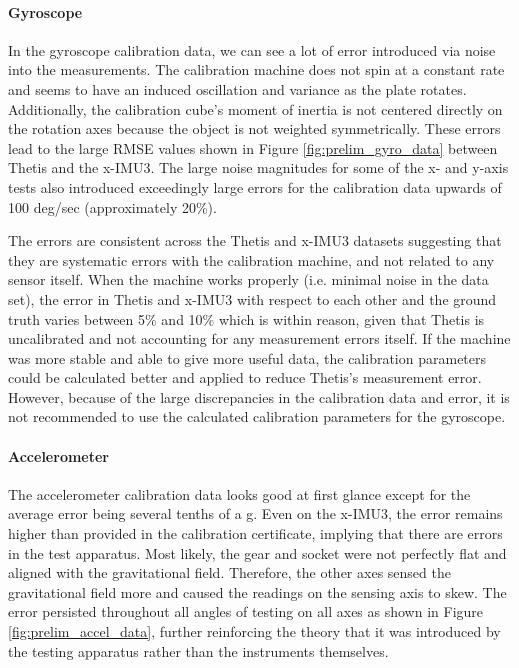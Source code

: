 \paragraph*{Gyroscope} In the gyroscope calibration data, we can see a lot of error introduced via noise into the measurements.
The calibration machine does not spin at a constant rate and seems to have an induced oscillation and variance as the plate rotates.
Additionally, the calibration cube's moment of inertia is not centered directly on the rotation axes because the object is not weighted symmetrically.
These errors lead to the large RMSE values shown in Figure \ref{fig:prelim_gyro_data} between Thetis and the x-IMU3.
The large noise magnitudes for some of the x- and y-axis tests also introduced exceedingly large errors for the calibration data upwards of 100 deg/sec (approximately 20\%).

The errors are consistent across the Thetis and x-IMU3 datasets suggesting that they are systematic errors with the calibration machine, and not related to any sensor itself.
When the machine works properly (i.e. minimal noise in the data set), the error in Thetis and x-IMU3 with respect to each other and the ground truth varies between 5\% and 10\% which is within reason, given that Thetis is uncalibrated and not accounting for any measurement errors itself.
If the machine was more stable and able to give more useful data, the calibration parameters could be calculated better and applied to reduce Thetis's measurement error.
However, because of the large discrepancies in the calibration data and error, it is not recommended to use the calculated calibration parameters for the gyroscope.

\paragraph*{Accelerometer} The accelerometer calibration data looks good at first glance except for the average error being several tenths of a g.
Even on the x-IMU3, the error remains higher than provided in the calibration certificate, implying that there are errors in the test apparatus.
Most likely, the gear and socket were not perfectly flat and aligned with the gravitational field.
Therefore, the other axes sensed the gravitational field more and caused the readings on the sensing axis to skew.
The error persisted throughout all angles of testing on all axes as shown in Figure \ref{fig:prelim_accel_data}, further reinforcing the theory that it was introduced by the testing apparatus rather than the instruments themselves.

